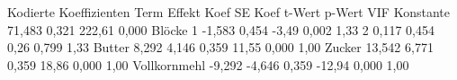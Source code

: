 Kodierte Koeffizienten
Term	Effekt	Koef	SE Koef	t-Wert	p-Wert	VIF
Konstante	 	71,483	0,321	222,61	0,000	 
Blöcke	 	 	 	 	 	 
  1	 	-1,583	0,454	-3,49	0,002	1,33
  2	 	0,117	0,454	0,26	0,799	1,33
Butter	8,292	4,146	0,359	11,55	0,000	1,00
Zucker	13,542	6,771	0,359	18,86	0,000	1,00
Vollkornmehl	-9,292	-4,646	0,359	-12,94	0,000	1,00
